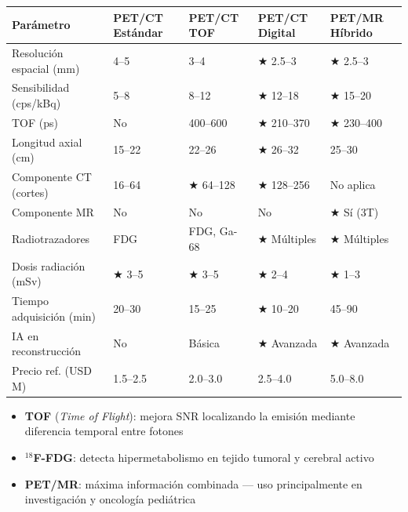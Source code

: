 \documentclass[11pt, a4paper]{article}
\begin{document}
\begin{center}
\renewcommand{\arraystretch}{1.25}
\begin{tabular}{P{4.5cm} C{2.3cm} C{2.3cm} C{2.3cm} C{2.3cm}}
\toprule
{}
\textbf{\color{white}Parámetro} &
\textbf{\color{white}PET/CT Estándar} &
\textbf{\color{white}PET/CT TOF} &
\textbf{\color{white}PET/CT Digital} &
\textbf{\color{white}PET/MR Híbrido} \\
\midrule
Resolución espacial (mm)   & 4--5 & 3--4 & $\bigstar$ 2.5--3 & $\bigstar$ 2.5--3 \\
Sensibilidad (cps/kBq)     & 5--8 & 8--12 & $\bigstar$ 12--18 & $\bigstar$ 15--20 \\
TOF (ps)                   & No & 400--600 & $\bigstar$ 210--370 & $\bigstar$ 230--400 \\
Longitud axial (cm)        & 15--22 & 22--26 & $\bigstar$ 26--32 & 25--30 \\
Componente CT (cortes)     & 16--64 & $\bigstar$ 64--128 & $\bigstar$ 128--256 & No aplica \\
Componente MR              & No & No & No & $\bigstar$ Sí (3T) \\
Radiotrazadores            & FDG & FDG, Ga-68 & $\bigstar$ Múltiples & $\bigstar$ Múltiples \\
Dosis radiación (mSv)      & $\bigstar$ 3--5 & $\bigstar$ 3--5 & $\bigstar$ 2--4 & $\bigstar$ 1--3 \\
Tiempo adquisición (min)   & 20--30 & 15--25 & $\bigstar$ 10--20 & 45--90 \\
IA en reconstrucción       & No & Básica & $\bigstar$ Avanzada & $\bigstar$ Avanzada \\
Precio ref. (USD M)        & 1.5--2.5 & 2.0--3.0 & 2.5--4.0 & 5.0--8.0 \\
\bottomrule
\end{tabular}
\end{center}

\begin{itemize}[leftmargin=*, itemsep=2pt, topsep=4pt]
  \footnotesize
  \item \textbf{TOF} (\textit{Time of Flight}): mejora SNR localizando la emisión mediante diferencia temporal entre fotones
  \item \textbf{$^{18}$F-FDG}: detecta hipermetabolismo en tejido tumoral y cerebral activo
  \item \textbf{PET/MR}: máxima información combinada --- uso principalmente en investigación y oncología pediátrica
\end{itemize}
\end{document}
